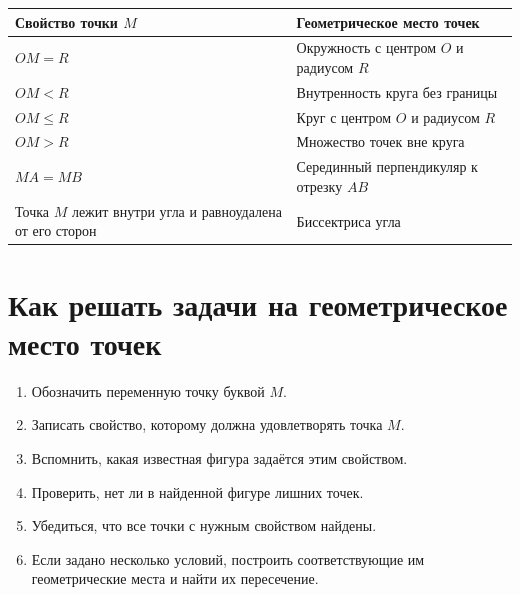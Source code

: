 	\begin{center}
		\begin{tabularx}{\textwidth}{
				>{\raggedright\arraybackslash}p{}
				>{\raggedright\arraybackslash}X
			}
			\toprule
			\textbf{Свойство точки \(M\)}
			&
			\textbf{Геометрическое место точек}
			\\
			\midrule
			
			\(OM=R\)
			&
			Окружность с центром \(O\) и радиусом \(R\)
			\\
			
			\(OM<R\)
			&
			Внутренность круга без границы
			\\
			
			\(OM\leq R\)
			&
			Круг с центром \(O\) и радиусом \(R\)
			\\
			
			\(OM>R\)
			&
			Множество точек вне круга
			\\
			
			\(MA=MB\)
			&
			Серединный перпендикуляр к отрезку \(AB\)
			\\
			
			Точка \(M\) лежит внутри угла и равноудалена от его сторон
			&
			Биссектриса угла
			\\
			
			\bottomrule
		\end{tabularx}
	\end{center}
	
	\section{Как решать задачи на геометрическое место точек}
	
	\begin{algorithmbox}
		\begin{enumerate}
			\item Обозначить переменную точку буквой \(M\).
			\item Записать свойство, которому должна удовлетворять точка \(M\).
			\item Вспомнить, какая известная фигура задаётся этим свойством.
			\item Проверить, нет ли в найденной фигуре лишних точек.
			\item Убедиться, что все точки с нужным свойством найдены.
				\item Если задано несколько условий, построить соответствующие им
				геометрические места и найти их пересечение.
		\end{enumerate}
	\end{algorithmbox}
	
